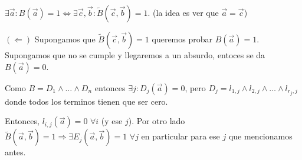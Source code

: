 \documentclass[12pt,a4paper]{article}
\begin{document}
$\exists \overrightarrow{a}: B(\overrightarrow{a}) = 1 \Leftrightarrow \exists \overrightarrow{c}, \overrightarrow{b} : \widetilde{B}(\overrightarrow{c}, \overrightarrow{b}) = 1$.
(la idea es ver que $\overrightarrow{a} = \overrightarrow{c}$)
\medskip

$(\Leftarrow)$ Supongamos que $\widetilde{B}(\overrightarrow{c}, \overrightarrow{b}) =1$ 
queremos probar $B(\overrightarrow{a}) = 1$. Supongamos que no se cumple y llegaremos 
a un absurdo, entoces se da $B(\overrightarrow{a}) = 0$.
\medskip

Como $B = D_{1} \wedge \ldots \wedge D_{n}$ entonces $\exists j : D_{j}(\overrightarrow{a}) = 0$, 
pero $D_{j} = l_{1,j} \wedge l_{2,j} \wedge \ldots \wedge l_{r_{j},j}$ donde todos 
los terminos tienen que ser cero.
\medskip

Entonces, $l_{i,j}(\overrightarrow{a}) = 0\,\, \forall i$ (y ese $j$). Por otro 
lado $\widetilde{B}(\overrightarrow{a}, \overrightarrow{b}) = 1 \Rightarrow \exists E_{j}(\overrightarrow{a},\overrightarrow{b}) = 1\,\, \forall j$
en particular para ese $j$ que mencionamos antes.
\medskip
\end{document}
